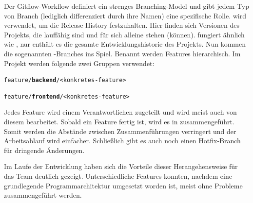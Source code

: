 Der Gitflow-Workflow definiert ein strenges Branching-Model und gibt jedem Typ von Branch (lediglich differenziert durch ihre Namen) eine spezifische Rolle.  wird verwendet, um die Release-History festzuhalten. Hier finden sich Versionen des Projekts, die lauffähig sind und für sich alleine stehen (können).  fungiert ähnlich wie , nur enthält es die gesamte Entwicklungshistorie des Projekts. Nun kommen die sogenannten -Branches ins Spiel. Benannt werden Features hierarchisch. Im Projekt werden folgende zwei Gruppen verwendet: 

\begin{minipage}{\textwidth}
\texttt{feature/\textbf{backend}/<konkretes-feature>}

\texttt{feature/\textbf{frontend}/<konkretes-feature>}
\end{minipage}

Jedes Feature wird einem Verantwortlichen zugeteilt und wird meist auch von diesem bearbeitet. Sobald ein Feature fertig ist, wird es in  zusammengeführt. Somit werden die Abstände zwischen Zusammenführungen verringert und der Arbeitsablauf wird einfacher. Schließlich gibt es auch noch einen Hotfix-Branch für dringende Änderungen.

Im Laufe der Entwicklung haben sich die Vorteile dieser Herangehensweise für das Team deutlich gezeigt. Unterschiedliche Features konnten, nachdem eine grundlegende Programmarchitektur umgesetzt worden ist, meist ohne Probleme zusammengeführt werden. 